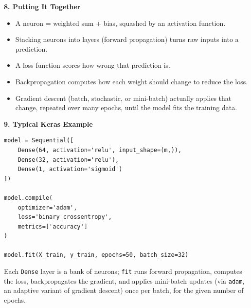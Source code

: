 \documentclass[conference]{IEEEtran}
\begin{document}
\bigskip

\textbf{8. Putting It Together}

\begin{itemize}
    \item A neuron = weighted sum + bias, squashed by an activation
          function.
    \item Stacking neurons into layers (forward propagation) turns raw
          inputs into a prediction.
    \item A loss function scores how wrong that prediction is.
    \item Backpropagation computes how each weight should change to
          reduce the loss.
    \item Gradient descent (batch, stochastic, or mini-batch) actually
          applies that change, repeated over many epochs, until the
          model fits the training data.
\end{itemize}

\bigskip

\textbf{9. Typical Keras Example}

\begin{verbatim}
model = Sequential([
    Dense(64, activation='relu', input_shape=(m,)),
    Dense(32, activation='relu'),
    Dense(1, activation='sigmoid')
])

model.compile(
    optimizer='adam',
    loss='binary_crossentropy',
    metrics=['accuracy']
)

model.fit(X_train, y_train, epochs=50, batch_size=32)
\end{verbatim}

Each \texttt{Dense} layer is a bank of neurons; \texttt{fit} runs forward
propagation, computes the loss, backpropagates the gradient, and applies
mini-batch updates (via \texttt{adam}, an adaptive variant of gradient
descent) once per batch, for the given number of epochs.
\end{document}
